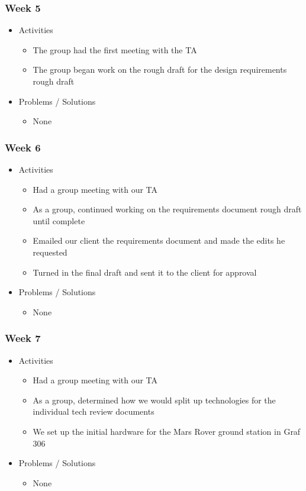 \subsubsection{Week 5}
\begin{itemize}
\item Activities
  \begin{itemize}
  \item The group had the first meeting with the TA
  \item The group began work on the rough draft for the design requirements rough draft
  \end{itemize}
  
\item Problems / Solutions
  \begin{itemize}
  \item None
  \end{itemize}
\end{itemize}


\subsubsection{Week 6}
\begin{itemize}
\item Activities
  \begin{itemize}
  \item Had a group meeting with our TA
  \item As a group, continued working on the requirements document rough draft until complete
  \item Emailed our client the requirements document and made the edits he requested
  \item Turned in the final draft and sent it to the client for approval
  \end{itemize}
  
\item Problems / Solutions
  \begin{itemize}
  \item None
  \end{itemize}
\end{itemize}


\subsubsection{Week 7}
\begin{itemize}
\item Activities
  \begin{itemize}
  \item Had a group meeting with our TA
  \item As a group, determined how we would split up technologies for the individual tech review documents
  \item We set up the initial hardware for the Mars Rover ground station in Graf 306
  \end{itemize}
  
\item Problems / Solutions
  \begin{itemize}
  \item None
  \end{itemize}
\end{itemize}


